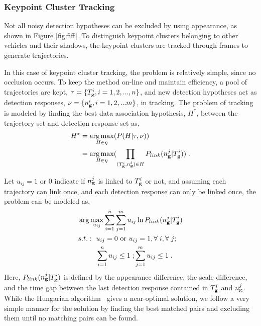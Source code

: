 \subsubsection{Keypoint Cluster Tracking}

Not all noisy detection hypotheses can be excluded by using appearance, as shown in Figure \ref{fig:fiff}. To distinguish keypoint clusters belonging to other vehicles and their shadows, the keypoint clusters are tracked through frames to generate trajectories.

In this case of keypoint cluster tracking, the problem is relatively simple, since no occlusion occurs. To keep the method on-line and maintain efficiency, a pool of trajectories are kept, $\tau=\{T_{\bf{g}}^i,i=1,2,...,n\}$, and new detection hypotheses act as detection responses, $\nu=\{n_{\bf{g}}^i,i=1,2,...m\}$, in tracking. The problem of tracking is modeled by finding the best data association hypothesis, $H^*$, between the trajectory set and detection response set as,
\begin{equation}
\begin{aligned}
{H^*} &= \mathop {\arg \max }\limits_{H \in \eta
} (P(H|\tau,\nu )) \\
&= \mathop {\arg \max }\limits_{H \in \eta }
(\prod\limits_{(T_{\bf{g}}^i,n_{\bf{g}}^j) \in H} {P_{link}(n_{\bf{g}}^j|T_{\bf{g}}^i)} ) \;.
\end{aligned}
\label{eq3}
\end{equation}

Let $u_{ij}=1 \mbox{ or } 0$ indicate if $n_{\bf{g}}^j$ is linked to $T_{\bf{g}}^i$ or not, and assuming each trajectory can link once, and each detection response can only be linked once, the problem can be modeled as,
\[
\begin{aligned}
&\arg \max\limits_{u_{ij}} \sum\limits_{i = 1}^n \sum\limits_{j = 1}^m u_{ij} \ln P_{link}(n_{\bf{g}}^j|T_{\bf{g}}^i)\\
&
\begin{aligned}
    s.t.:\mbox{ }&u_{ij}=0\mbox{ or }u_{ij}=1,\forall\;i,\forall\;j;\\
    &\sum\limits_{i = 1}^n {u_{ij}} \leq 1\;; \sum\limits_{j = 1}^m {u_{ij}}\leq 1\;.
\end{aligned}
\end{aligned}
\]
Here, $P_{link}(n_{\bf{g}}^j|T_{\bf{g}}^i)$ is defined by the appearance difference, the scale difference, and the time gap between the last detection response contained in $T_{\bf{g}}^i$ and $n_{\bf{g}}^j$. While the Hungarian algorithm~\citep{ha} gives a near-optimal solution, we follow a very simple manner for the solution by finding the best matched pairs and excluding them until no matching pairs can be found.

